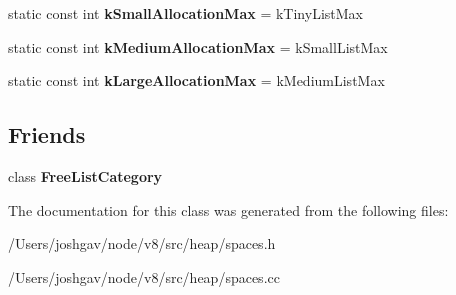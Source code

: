 \begin{DoxyCompactItemize}
\item 
static const int {\bfseries k\+Small\+Allocation\+Max} = k\+Tiny\+List\+Max\hypertarget{classv8_1_1internal_1_1_free_list_ab14ef9fa4c3c68ebf81d61b69086bcbe}{}\label{classv8_1_1internal_1_1_free_list_ab14ef9fa4c3c68ebf81d61b69086bcbe}

\item 
static const int {\bfseries k\+Medium\+Allocation\+Max} = k\+Small\+List\+Max\hypertarget{classv8_1_1internal_1_1_free_list_af43ecd4cd4d684a9ecaf0bacf65aaec0}{}\label{classv8_1_1internal_1_1_free_list_af43ecd4cd4d684a9ecaf0bacf65aaec0}

\item 
static const int {\bfseries k\+Large\+Allocation\+Max} = k\+Medium\+List\+Max\hypertarget{classv8_1_1internal_1_1_free_list_ab69535b4e335fb4123d9b3b013135a9f}{}\label{classv8_1_1internal_1_1_free_list_ab69535b4e335fb4123d9b3b013135a9f}

\end{DoxyCompactItemize}
\subsection*{Friends}
\begin{DoxyCompactItemize}
\item 
class {\bfseries Free\+List\+Category}\hypertarget{classv8_1_1internal_1_1_free_list_ac7b8d83f9833f7883a102608d8720210}{}\label{classv8_1_1internal_1_1_free_list_ac7b8d83f9833f7883a102608d8720210}

\end{DoxyCompactItemize}


The documentation for this class was generated from the following files\+:\begin{DoxyCompactItemize}
\item 
/\+Users/joshgav/node/v8/src/heap/spaces.\+h\item 
/\+Users/joshgav/node/v8/src/heap/spaces.\+cc\end{DoxyCompactItemize}
